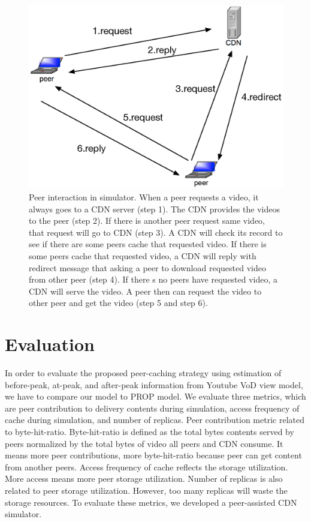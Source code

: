 \documentclass[10pt,final,journal,a4paper]{IEEEtran}
\begin{document}
\begin{figure}[!t]
\begin{center}
\includegraphics[scale=0.4]{graphs/p2p-system-description.eps}
\end{center}
\caption{Peer interaction in simulator.
When a peer requests a video, it always goes to a CDN server (step 1). 
The CDN provides the videos to the peer (step 2). 
If there is another peer request same video, that request will go to CDN (step 3).  
A CDN will check its record to see if there are some peers cache that requested video.  
If there is some peers cache that requested video, a CDN will reply with redirect message that asking a peer to download requested video from other peer (step 4).
If there s no peers have requested video, a CDN will serve the video.   
A peer then can request the video to other peer and get the video (step 5 and step 6).
}
\label{fig:p2pcdninteractioninsimulator}
\end{figure} 



\section{Evaluation}\label{evaluation}

In order to evaluate the proposed peer-caching strategy using estimation of before-peak, at-peak, and after-peak information from Youtube VoD view model, we have to compare our model to PROP model.
We evaluate three metrics, which are peer contribution to delivery contents during simulation,  access frequency of cache during simulation, and number of replicas. 
Peer contribution metric related to byte-hit-ratio. 
Byte-hit-ratio is defined as the total bytes contents served by peers normalized by the total bytes of video all peers and CDN consume.
It means more peer contributions, more byte-hit-ratio because peer can get content from another peers. 
Access frequency of cache reflects the storage utilization. 
More access means more peer storage utilization.  
Number of replicas is also related to peer storage utilization.  
However, too many replicas will waste the storage resources.
To evaluate these metrics, we developed a peer-assisted CDN simulator. 
\end{document}
